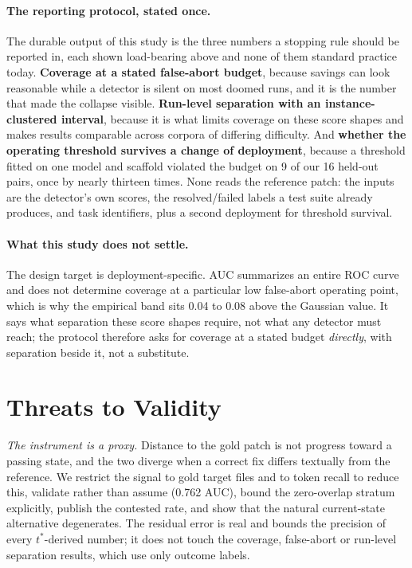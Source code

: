 \documentclass[sigconf,screen]{acmart}
\begin{document}
\paragraph{The reporting protocol, stated once.} The durable output of this study is the three
numbers a stopping rule should be reported in, each shown load-bearing above and none of them
standard practice today. \textbf{Coverage at a stated false-abort budget}, because savings can look
reasonable while a detector is silent on most doomed runs, and it is the number that made the
collapse visible. \textbf{Run-level separation with an instance-clustered interval}, because it
is what limits coverage on these score shapes and makes results comparable across
corpora of differing difficulty. And \textbf{whether the operating threshold survives a change of
deployment}, because a threshold fitted on one model and scaffold violated the budget on 9 of our 16
held-out pairs, once by nearly thirteen times. None reads the reference patch: the inputs are the
detector's own scores, the resolved/failed labels a test suite already produces, and task
identifiers, plus a second deployment for threshold survival.

\paragraph{What this study does not settle.} The design target is deployment-specific. AUC summarizes an entire ROC curve and does not
determine coverage at a particular low false-abort operating point, which is why the empirical band
sits 0.04 to 0.08 above the Gaussian value. It says what
separation these score shapes require, not what any detector must reach; the protocol therefore asks
for coverage at a stated budget \emph{directly}, with separation beside it, not a substitute.

\section{Threats to Validity}
\emph{The instrument is a proxy.} Distance to the gold patch is not progress toward a passing state,
and the two diverge when a correct fix differs textually from the reference. We restrict the signal
to gold target files and to token recall to reduce this, validate rather than assume (0.762 AUC),
bound the zero-overlap stratum explicitly, publish the contested rate, and show that the natural
current-state alternative degenerates. The residual error is real and bounds the precision of every
$t^{*}$-derived number; it does not touch the coverage, false-abort or run-level separation
results, which use only outcome labels.
\end{document}
